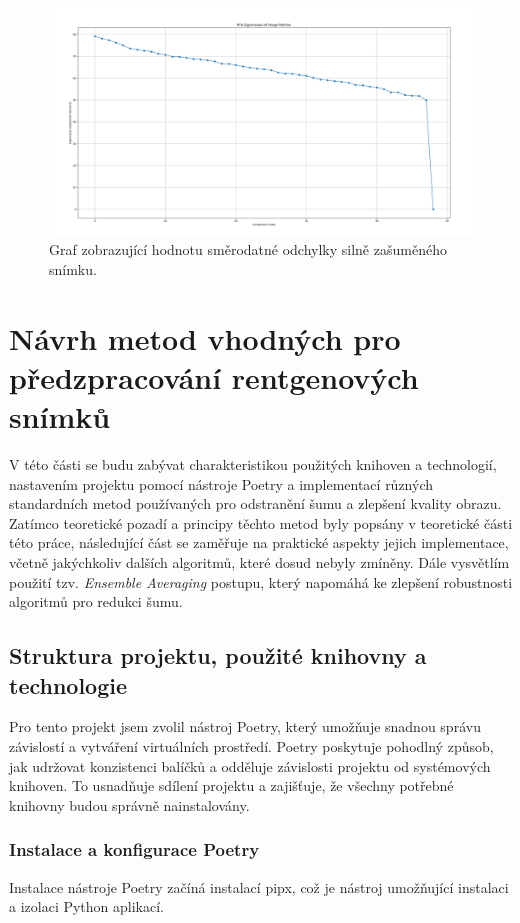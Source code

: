 \documentclass[male,czech,api_ing]{thesis}
\begin{document}
\begin{figure}[h]
    \centering
    \includegraphics[width=\linewidth]{Prilohy/Obrazky/PCA_std_all_three_noise_types.png}
    \caption{Graf zobrazující hodnotu směrodatné odchylky silně zašuměného snímku.}
    \label{fig:PCA_std}
\end{figure}

\section{Návrh metod vhodných pro předzpracování rentgenových snímků}
V této části se budu zabývat charakteristikou použitých knihoven a technologií, nastavením projektu pomocí nástroje Poetry a implementací různých standardních metod používaných pro odstranění šumu a zlepšení kvality obrazu. Zatímco teoretické pozadí a principy těchto metod byly popsány v teoretické části této práce, následující část se zaměřuje na praktické aspekty jejich implementace, včetně jakýchkoliv dalších algoritmů, které dosud nebyly zmíněny. Dále vysvětlím použití tzv. \textit{Ensemble Averaging} postupu, který napomáhá ke zlepšení robustnosti algoritmů pro redukci šumu.

\subsection{Struktura projektu, použité knihovny a technologie}
Pro tento projekt jsem zvolil nástroj Poetry, který umožňuje snadnou správu závislostí a vytváření virtuálních prostředí. Poetry poskytuje pohodlný způsob, jak udržovat konzistenci balíčků a odděluje závislosti projektu od systémových knihoven. To usnadňuje sdílení projektu a zajišťuje, že všechny potřebné knihovny budou správně nainstalovány.

\subsubsection{Instalace a konfigurace Poetry}
Instalace nástroje Poetry začíná instalací pipx, což je nástroj umožňující instalaci a izolaci Python aplikací. 
\end{document}
